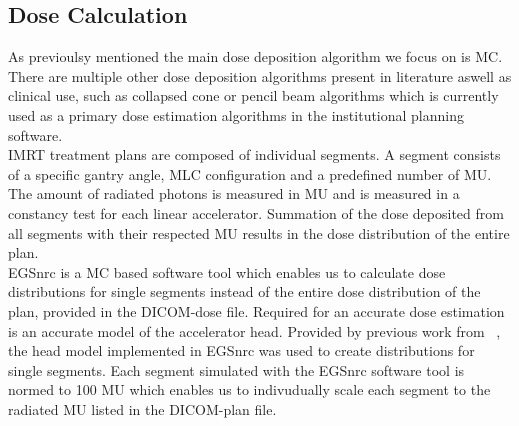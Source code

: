 \subsection{Dose Calculation}

As previoulsy mentioned the main dose deposition algorithm we focus on is \acs{MC}.
There are multiple other dose deposition algorithms present in literature aswell as clinical use, such as collapsed cone \cite{ahnesjo_collapsed_1989} or pencil beam algorithms \cite{mohan_differential_1986} which is currently used as a primary dose estimation algorithms in the institutional planning software.\\
\acs{IMRT} treatment plans are composed of individual segments. 
A segment consists of a specific gantry angle, \acs{MLC} configuration and a predefined number of \ac{MU}.
The amount of radiated photons is measured in \acs{MU} and is measured in a constancy test for each linear accelerator.
Summation of the dose deposited from all segments with their respected \acs{MU} results in the dose distribution of the entire plan.\\
EGSnrc \cite{noauthor_nrc-cnrcegsnrc_2021} is a \acs{MC} based software tool which enables us to calculate dose distributions for single segments instead of the entire dose distribution of the plan, provided in the DICOM-dose file.
Required for an accurate dose estimation is an accurate model of the accelerator head.
Provided by previous work from \citeauthor{friedel_development_2019}~\cite{friedel_development_2019}, the head model implemented in EGSnrc was used to create distributions for single segments. 
Each segment simulated with the EGSnrc software tool is normed to 100 \ac{MU} which enables us to indivudually scale each segment to the radiated \ac{MU} listed in the DICOM-plan file. 

